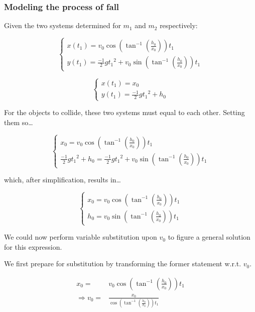 \documentclass[letterpaper]{article}
\begin{document}
\subsubsection{Modeling the process of fall}
\label{sec:orgb77e84c}
Given the two systems determined for \(m_1\) and \(m_2\) respectively:

\begin{equation}
    \begin{cases}
        x(t_1) = v_0\cos(\tan^{-1}(\frac{h_0}{x_0}))t_1 \\
        y(t_1) = \frac{-1}{2}g {t_1}^2 + v_0\sin(\tan^{-1}(\frac{h_0}{x_0})) t_1
    \end{cases}
\end{equation}

\begin{equation}
    \begin{cases}
        x(t_1) = x_0 \\
        y(t_1) = \frac{-1}{2}g{t_1}^2 + h_0
    \end{cases}
\end{equation}

For the objects to collide, these two systems must equal to each other. Setting them so\ldots{}

\begin{equation}
    \begin{cases}
        x_0 = v_0\cos(\tan^{-1}(\frac{h_0}{x_0}))t_1\\
        \frac{-1}{2}g{t_1}^2 + h_0 = \frac{-1}{2}g {t_1}^2 + v_0\sin(\tan^{-1}(\frac{h_0}{x_0})) t_1
    \end{cases}
\end{equation}

which, after simplification, results in\ldots{}

\begin{equation}
    \begin{cases}
        x_0 = v_0\cos(\tan^{-1}(\frac{h_0}{x_0}))t_1\\
        h_0 = v_0\sin(\tan^{-1}(\frac{h_0}{x_0})) t_1
    \end{cases}
\end{equation}

We could now perform variable substitution upon \(v_0\) to figure a general solution for this expression.

We first prepare for substitution by transforming the former statement w.r.t. \(v_0\).

\begin{align}
    x_0 =& v_0\cos(\tan^{-1}(\frac{h_0}{x_0}))t_1 \\
\Rightarrow v_0 =& \frac{x_0}{\cos(\tan^{-1}(\frac{h_0}{x_0}))t_1} 
\end{align}
\end{document}
